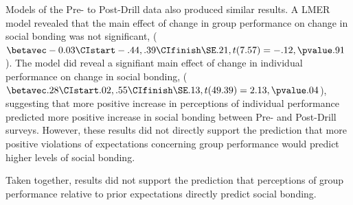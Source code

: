 
Models of the Pre- to Post-Drill data also produced similar results.  A LMER model revealed that the main effect of change in group performance on change in social bonding was not significant, ($\betavec -0.03 \CIstart -.44, .39 \CIfinish \SE .21, t(7.57) = -.12, \pvalue .91$). The model did reveal a signifiant main effect of change in individual performance on change in social bonding, ($\betavec .28 \CIstart .02, .55 \CIfinish \SE .13, t(49.39) = 2.13, \pvalue .04$), suggesting that more positive increase in perceptions of individual performance predicted more positive increase in social bonding between Pre- and Post-Drill surveys.  However, these results did not directly support the prediction that more positive violations of expectations concerning group performance would predict higher levels of social bonding.

Taken together, results did not support the prediction that perceptions of group performance relative to prior expectations directly predict social bonding.





